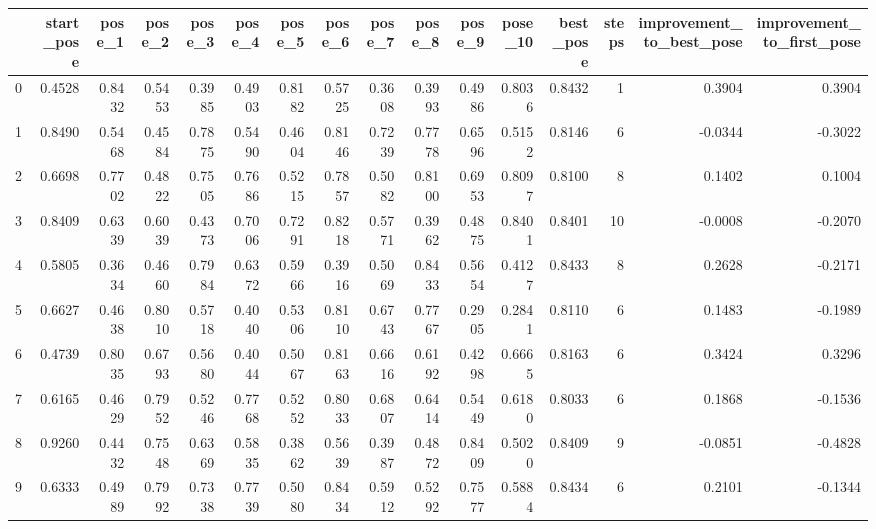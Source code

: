 \begin{tabular}{lrrrrrrrrrrrrrrr}
\toprule
{} &  start\_pose &  pose\_1 &  pose\_2 &  pose\_3 &  pose\_4 &  pose\_5 &  pose\_6 &  pose\_7 &  pose\_8 &  pose\_9 &  pose\_10 &  best\_pose &  steps &  improvement\_to\_best\_pose &  improvement\_to\_first\_pose \\
\midrule
0   &      0.4528 &  0.8432 &  0.5453 &  0.3985 &  0.4903 &  0.8182 &  0.5725 &  0.3608 &  0.3993 &  0.4986 &   0.8036 &     0.8432 &      1 &                    0.3904 &                     0.3904 \\
1   &      0.8490 &  0.5468 &  0.4584 &  0.7875 &  0.5490 &  0.4604 &  0.8146 &  0.7239 &  0.7778 &  0.6596 &   0.5152 &     0.8146 &      6 &                   -0.0344 &                    -0.3022 \\
2   &      0.6698 &  0.7702 &  0.4822 &  0.7505 &  0.7686 &  0.5215 &  0.7857 &  0.5082 &  0.8100 &  0.6953 &   0.8097 &     0.8100 &      8 &                    0.1402 &                     0.1004 \\
3   &      0.8409 &  0.6339 &  0.6039 &  0.4373 &  0.7006 &  0.7291 &  0.8218 &  0.5771 &  0.3962 &  0.4875 &   0.8401 &     0.8401 &     10 &                   -0.0008 &                    -0.2070 \\
4   &      0.5805 &  0.3634 &  0.4660 &  0.7984 &  0.6372 &  0.5966 &  0.3916 &  0.5069 &  0.8433 &  0.5654 &   0.4127 &     0.8433 &      8 &                    0.2628 &                    -0.2171 \\
5   &      0.6627 &  0.4638 &  0.8010 &  0.5718 &  0.4040 &  0.5306 &  0.8110 &  0.6743 &  0.7767 &  0.2905 &   0.2841 &     0.8110 &      6 &                    0.1483 &                    -0.1989 \\
6   &      0.4739 &  0.8035 &  0.6793 &  0.5680 &  0.4044 &  0.5067 &  0.8163 &  0.6616 &  0.6192 &  0.4298 &   0.6665 &     0.8163 &      6 &                    0.3424 &                     0.3296 \\
7   &      0.6165 &  0.4629 &  0.7952 &  0.5246 &  0.7768 &  0.5252 &  0.8033 &  0.6807 &  0.6414 &  0.5449 &   0.6180 &     0.8033 &      6 &                    0.1868 &                    -0.1536 \\
8   &      0.9260 &  0.4432 &  0.7548 &  0.6369 &  0.5835 &  0.3862 &  0.5639 &  0.3987 &  0.4872 &  0.8409 &   0.5020 &     0.8409 &      9 &                   -0.0851 &                    -0.4828 \\
9   &      0.6333 &  0.4989 &  0.7992 &  0.7338 &  0.7739 &  0.5080 &  0.8434 &  0.5912 &  0.5292 &  0.7577 &   0.5884 &     0.8434 &      6 &                    0.2101 &                    -0.1344 \\

\end{tabular}
